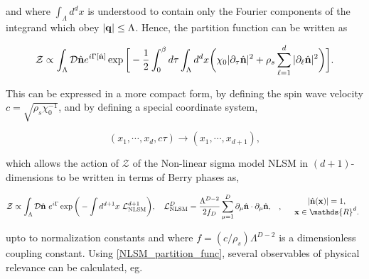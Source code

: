 and where $\int_{\Lambda} d^{d} x$ is understood to contain only the Fourier components of the integrand which obey $|{\bf q}| \leq \Lambda$. Hence, the partition function can be written as 

\begin{equation}
    \mathcal{Z} \propto \int_{\Lambda} \mathcal{D} \hat{{\bf n}} e^{i \Gamma[\hat{{\bf n}}]} \exp \bigg[
    -\frac{1}{2} \int_{0}^{\beta} d\tau \int_{\Lambda} d^d x \bigg(
    \chi_0 |\partial_{\tau} \hat{\bf n}|^2 + \rho_s \sum_{\ell = 1}^{d} |\partial_{\ell} \hat{\bf n}|^2
    \bigg)
    \bigg].
\end{equation}

This can be expressed in a more compact form, by defining the spin wave velocity $c = \sqrt{\rho_s \chi_0^{-1}}$, and by defining a special coordinate system,

\begin{equation}
    (x_1, \cdots, x_d, c\tau) \rightarrow (x_1, \cdots, x_{d+1}),
\end{equation}

which allows the action of $\mathcal{Z}$ of the Non-linear sigma model NLSM in $(d+1)$-dimensions to be written in terms of Berry phases as,

\begin{equation}
    \begin{split}
        &\mathcal{Z} \propto \int_{\Lambda} \mathcal{D}\hat{{\bf n}} \blanky e^{i\Gamma} \exp \bigg(- \int d^{d+1}x \blanky \mathcal{L}^{d+1}_{\textnormal{NLSM}}\bigg), \quad \mathcal{L}^{D}_{\textnormal{NLSM}} = \frac{\Lambda^{D-2}}{2f_D} \sum_{\mu = 1}^{D} \partial_{\mu} \hat{{\bf n}} \cdot \partial_{\mu} \hat{{\bf n}},
    \end{split}, \quad \begin{array}{cc}
         |\hat{{\bf n}}({\bf x})| = 1,  \\
         {\bf x} \in \mathds{R}^d. 
    \end{array}
        \label{NLSM_partition_func}
\end{equation}

upto to normalization constants and where $f = (c/\rho_s) \Lambda^{D-2}$ is a dimensionless coupling constant. Using \cref{NLSM_partition_func}, several observables of physical relevance can be calculated, eg. 

